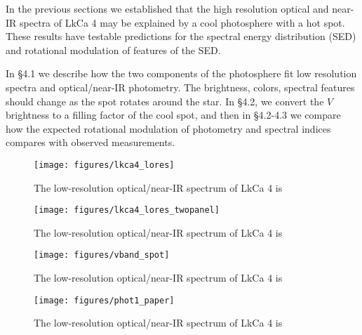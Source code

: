 \documentclass[twocolumn]{emulateapj}%
\begin{document}
In the previous sections we established that the high resolution optical and near-IR spectra of LkCa 4 may be explained by a cool photosphere with a hot spot.  These results have testable predictions for the spectral energy distribution (SED) and rotational modulation of features of the SED.


In \S 4.1 we describe how the two components of the photosphere fit low resolution spectra and optical/near-IR photometry.  The brightness, colors, spectral features should change as the spot rotates around the star.  In \S 4.2, we convert the $V$ brightness to a filling factor of the cool spot, and then in \S 4.2-4.3 we compare how the expected rotational modulation of photometry and spectral indices compares with observed measurements.

\begin{figure*}
	\centering
    	\vspace{-120mm}
	\texttt{[image: figures/lkca4\_lores]} 
	\caption{The low-resolution optical/near-IR spectrum of LkCa 4 is }
	\label{fig:lores}
\end{figure*}



\begin{figure*}
	\centering
    	\vspace{-120mm}
	\texttt{[image: figures/lkca4\_lores\_twopanel]} 
	\caption{The low-resolution optical/near-IR spectrum of LkCa 4 is }
	\label{fig:lores_twopanel}
\end{figure*}


\begin{figure*}
	\centering
    	\vspace{-20mm}
	\texttt{[image: figures/vband\_spot]} 
    	\vspace{-100mm}
\caption{The low-resolution optical/near-IR spectrum of LkCa 4 is }
\label{fig:vband_spot}
\end{figure*}



\begin{figure}
	\centering
    	\vspace{-20mm}
	\texttt{[image: figures/phot1\_paper]} 
    	\vspace{-100mm}
\caption{The low-resolution optical/near-IR spectrum of LkCa 4 is }
\label{fig:vband_spot}
\end{figure}
\end{document}
